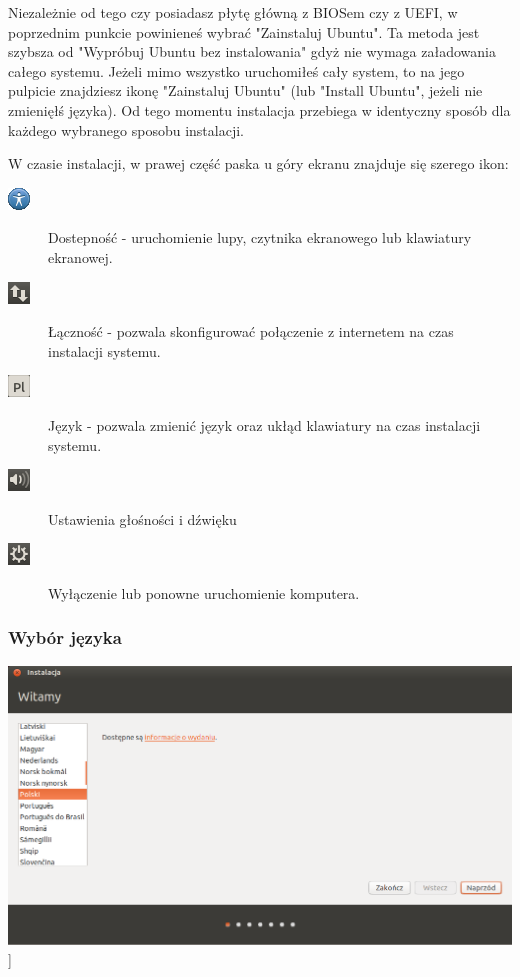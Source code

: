 Niezależnie od tego czy posiadasz płytę główną z BIOSem czy z UEFI, w poprzednim punkcie powinieneś wybrać "Zainstaluj Ubuntu". Ta metoda jest szybsza od "Wypróbuj Ubuntu bez instalowania" gdyż nie wymaga załadowania całego systemu. Jeżeli mimo wszystko uruchomiłeś cały system, to na jego pulpicie znajdziesz ikonę "Zainstaluj Ubuntu" (lub "Install Ubuntu", jeżeli nie zmienięłś języka). Od tego momentu instalacja przebiega w identyczny sposób dla każdego wybranego sposobu instalacji.

W czasie instalacji, w prawej część paska u góry ekranu znajduje się szerego ikon:
\begin{description}
\item[\includegraphics{images/ikony_dostempnosc.png}]Dostepność - uruchomienie lupy, czytnika ekranowego lub klawiatury ekranowej.
\item[\includegraphics{images/ikony_internet.png}]Łączność - pozwala skonfigurować połączenie z internetem na czas instalacji systemu.
\item[\includegraphics{images/ikony_jezyk.png}]Język - pozwala zmienić język oraz ukłąd klawiatury na czas instalacji systemu.
\item[\includegraphics{images/ikony_dzwiek.png}]Ustawienia głośności i dźwięku
\item[\includegraphics{images/ikony_zasilanie.png}]Wyłączenie lub ponowne uruchomienie komputera.
\end{description}
\clearpage

\subsubsection{Wybór języka}
\begin{center}
	\includegraphics[scale=0.5]{images/instalator_jezyk.png}]
\end{center}

